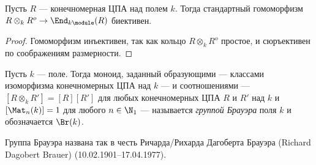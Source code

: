 \documentclass[
	extrafontsizes,
	11pt,
	hyphens,
]{memoir}
\begin{document}
\begin{theorem}
Пусть \(R\) --- конечномерная ЦПА над полем \(k\). Тогда стандартный гомоморфизм \(R \otimes_k R^o \to \End_{k\module}(R)\) биективен.
\end{theorem}

\begin{proof}
Гомоморфизм инъективен, так как кольцо \(R \otimes_k R^o\) простое, и сюръективен по соображениям размерности.
\end{proof}

\begin{definition}
Пусть \(k\) --- поле. Тогда моноид, заданный образующими --- классами изоморфизма конечномерных ЦПА над \(k\) --- и соотношениями --- \([R \otimes_k R'] = [R] [R']\) для любых конечномерных ЦПА \(R\) и \(R'\) над \(k\) и \([\Mat_n(k)] = 1\) для любого \(n \in \N_1\) --- называется \emph{группой Брауэра} поля \(k\) и обозначается \(\Br(k)\).
\end{definition}

\begin{remark}
Группа Брауэра названа так в честь Ричарда/Рихарда Дагоберта Брауэра (\textenglish{Richard Dagobert Brauer}) (10.02.1901--17.04.1977).
\end{remark}
\end{document}
